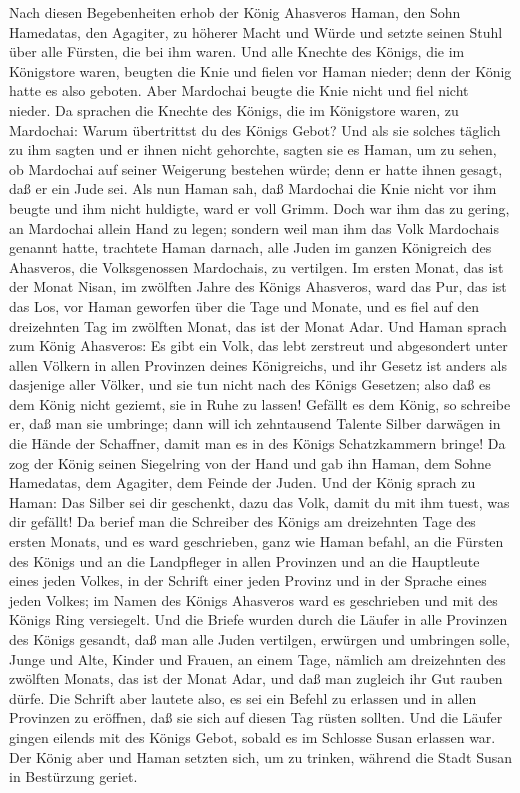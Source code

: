  Nach diesen Begebenheiten erhob der König Ahasveros
Haman, den Sohn Hamedatas, den Agagiter, zu höherer Macht und Würde und
setzte seinen Stuhl über alle Fürsten, die bei ihm waren. 
Und alle Knechte des Königs, die im Königstore waren, beugten die Knie
und fielen vor Haman nieder; denn der König hatte es also geboten. Aber
Mardochai beugte die Knie nicht und fiel nicht nieder.  Da
sprachen die Knechte des Königs, die im Königstore waren, zu Mardochai:
Warum übertrittst du des Königs Gebot?  Und als sie
solches täglich zu ihm sagten und er ihnen nicht gehorchte, sagten sie
es Haman, um zu sehen, ob Mardochai auf seiner Weigerung bestehen würde;
denn er hatte ihnen gesagt, daß er ein Jude sei.  Als nun
Haman sah, daß Mardochai die Knie nicht vor ihm beugte und ihm nicht
huldigte, ward er voll Grimm.  Doch war ihm das zu gering,
an Mardochai allein Hand zu legen; sondern weil man ihm das Volk
Mardochais genannt hatte, trachtete Haman darnach, alle Juden im ganzen
Königreich des Ahasveros, die Volksgenossen Mardochais, zu vertilgen.
 Im ersten Monat, das ist der Monat Nisan, im zwölften
Jahre des Königs Ahasveros, ward das Pur, das ist das Los, vor Haman
geworfen über die Tage und Monate, und es fiel auf den dreizehnten Tag
im zwölften Monat, das ist der Monat Adar.  Und Haman
sprach zum König Ahasveros: Es gibt ein Volk, das lebt zerstreut und
abgesondert unter allen Völkern in allen Provinzen deines Königreichs,
und ihr Gesetz ist anders als dasjenige aller Völker, und sie tun nicht
nach des Königs Gesetzen; also daß es dem König nicht geziemt, sie in
Ruhe zu lassen!  Gefällt es dem König, so schreibe er, daß
man sie umbringe; dann will ich zehntausend Talente Silber darwägen in
die Hände der Schaffner, damit man es in des Königs Schatzkammern
bringe!  Da zog der König seinen Siegelring von der Hand
und gab ihn Haman, dem Sohne Hamedatas, dem Agagiter, dem Feinde der
Juden.  Und der König sprach zu Haman: Das Silber sei dir
geschenkt, dazu das Volk, damit du mit ihm tuest, was dir gefällt!
 Da berief man die Schreiber des Königs am dreizehnten
Tage des ersten Monats, und es ward geschrieben, ganz wie Haman befahl,
an die Fürsten des Königs und an die Landpfleger in allen Provinzen und
an die Hauptleute eines jeden Volkes, in der Schrift einer jeden Provinz
und in der Sprache eines jeden Volkes; im Namen des Königs Ahasveros
ward es geschrieben und mit des Königs Ring versiegelt. 
Und die Briefe wurden durch die Läufer in alle Provinzen des Königs
gesandt, daß man alle Juden vertilgen, erwürgen und umbringen solle,
Junge und Alte, Kinder und Frauen, an einem Tage, nämlich am dreizehnten
des zwölften Monats, das ist der Monat Adar, und daß man zugleich ihr
Gut rauben dürfe.  Die Schrift aber lautete also, es sei
ein Befehl zu erlassen und in allen Provinzen zu eröffnen, daß sie sich
auf diesen Tag rüsten sollten.  Und die Läufer gingen
eilends mit des Königs Gebot, sobald es im Schlosse Susan erlassen war.
Der König aber und Haman setzten sich, um zu trinken, während die Stadt
Susan in Bestürzung geriet.

